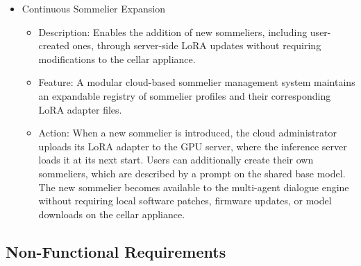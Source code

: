 \documentclass[conference]{IEEEtran}
\begin{document}
\begin{itemize}
    \item Continuous Sommelier Expansion
    \begin{itemize}
        \item Description: Enables the addition of new sommeliers, including user-created ones, through server-side LoRA updates without requiring modifications to the cellar appliance.
        \item Feature: A modular cloud-based sommelier management system maintains an expandable registry of sommelier profiles and their corresponding LoRA adapter files.
        \item Action: When a new sommelier is introduced, the cloud administrator uploads its LoRA adapter to the GPU server, where the inference server loads it at its next start. Users can additionally create their own sommeliers, which are described by a prompt on the shared base model. The new sommelier becomes available to the multi-agent dialogue engine without requiring local software patches, firmware updates, or model downloads on the cellar appliance.
    \end{itemize}
\end{itemize}


\subsection{Non-Functional Requirements}
\end{document}
